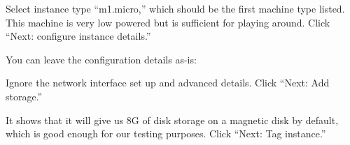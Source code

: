 \begin{fullwidth}

\step Select instance type ``m1.micro,'' which should be the first machine type listed. This machine is very low powered but is sufficient for playing around. Click ``Next: configure instance details.''


\step  You can leave the configuration details as-is:


\step  Ignore the network interface set up and advanced details.  Click ``Next: Add storage.''

\step It shows that it will give us 8G of disk storage on a magnetic disk by default, which is good enough for our testing purposes.  Click ``Next: Tag instance.''



\end{fullwidth}
